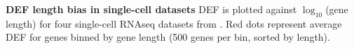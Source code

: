 \textbf{DEF length bias in single-cell datasets} DEF is plotted against $\log_{10}$(gene length) for four single-cell RNAseq datasets from \citep{Zeisel_2015,Tasic_2016,Zeisel_2018,Saunders_2018}. Red dots represent average DEF for genes binned by gene length (500 genes per bin, sorted by length).

